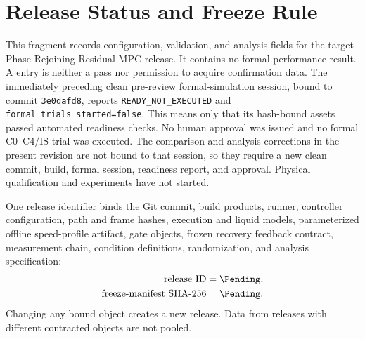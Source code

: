 
\section{Release Status and Freeze Rule}

This fragment records configuration, validation, and analysis fields for the
target Phase-Rejoining Residual MPC release. It contains no formal performance
result. A \Pending{} entry is neither a pass nor permission to acquire
confirmation data. The immediately preceding clean pre-review
formal-simulation session, bound to commit \texttt{3e0dafd8}, reports
\texttt{READY\_NOT\_EXECUTED} and
\texttt{formal\_trials\_started=false}. This means only that its hash-bound
assets passed automated readiness checks. No human approval was issued and no
formal C0--C4/IS trial was executed. The comparison and analysis corrections
in the present revision are not bound to that session, so they require a new
clean commit, build, formal session, readiness report, and approval. Physical
qualification and experiments have not started.

One release identifier binds the Git commit, build products, runner, controller
configuration, path and frame hashes, execution and liquid models,
parameterized offline speed-profile artifact, gate objects, frozen recovery
feedback contract, measurement chain, condition
definitions, randomization, and analysis specification:
\begin{align}
  \text{release ID} &= \text{\Pending},\\
  \text{freeze-manifest SHA-256} &= \text{\Pending}.
\end{align}
Changing any bound object creates a new release. Data from releases with
different contracted objects are not pooled.

